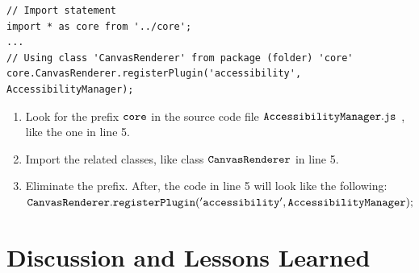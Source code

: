 \documentclass[review]{elsarticle}
\newcommand{\mcode}[1]{$\tt #1$}
\begin{document}
\begin{lstlisting}[caption=Example of import statement using wildcard in class \mcode{AccessibilityManager} in system {\sc pixi.js}, label=lst_import_wildcard, emph={[2]graphicsData},emphstyle={[2]\ttfamily\bfseries\color{darkgreen}}]
// Import statement
import * as core from '../core';
...
// Using class 'CanvasRenderer' from package (folder) 'core'
core.CanvasRenderer.registerPlugin('accessibility', AccessibilityManager);

\end{lstlisting} 
\begin{enumerate}
	\item Look for the prefix \mcode{core} in the source code file \mcode{AccessibilityManager.js} , like the one in line 5.
	\item Import the related classes, like class \mcode{CanvasRenderer} in line 5.
	\item Eliminate the prefix. After, the code in line 5 will look like the following:  \mcode{CanvasRenderer.registerPlugin('accessibility',AccessibilityManager);}
\end{enumerate}

\vspace{2.5 mm}

\section {Discussion and Lessons Learned}
\label{sec:discussion}
\end{document}
